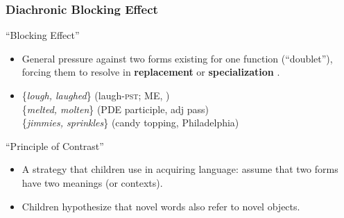 \documentclass[hyperref={pdfpagelabels=false}]{beamer}
\begin{document}
\begin{frame}
\frametitle{Diachronic Blocking Effect}
\begin{block}{``Blocking Effect'' \citep{aronoff1976}}
	\begin{itemize}
		\item General pressure against two forms existing for one function (``doublet''), forcing them to resolve in \textbf{replacement} or \textbf{specialization} \citep{kroch1994}.
		\item[ ]\{\textsl{lough, laughed}\} (laugh-\textsc{pst}; ME, \citealt{taylor1994})\\ \{\textsl{melted, molten}\} (PDE participle, adj pass)\\ \{\textsl{jimmies, sprinkles}\} (candy topping, Philadelphia)
	\end{itemize}
\end{block}
\begin{block}{``Principle of Contrast''}
	\begin{itemize}
		\item A strategy that children use in acquiring language: assume that two forms have two meanings (or contexts)\citep[][{ \it inter alia}]{clark1987, clark1990}.
		\item Children hypothesize that novel words also refer to novel objects.
	\end{itemize}
\end{block}
\end{frame}
\end{document}
